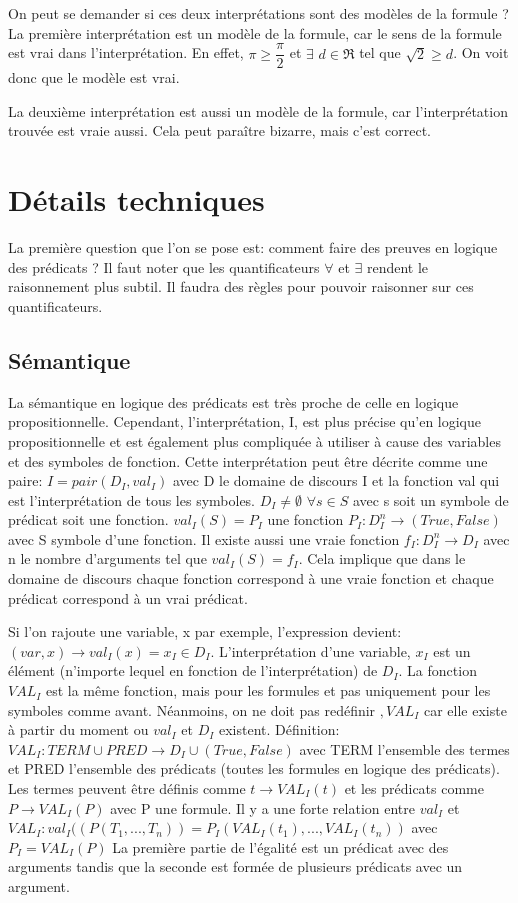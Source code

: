 On peut se demander si ces deux interprétations sont des modèles de la formule ? \\
La première interprétation est un modèle de la formule, car le sens de la formule est vrai dans l'interprétation. En effet, $\pi \geq \dfrac{\pi}{2}$ et $\exists$ $ d \in \Re$ tel que $\sqrt2 \geq d$. On voit donc que le modèle est vrai.

La deuxième interprétation est aussi un modèle de la formule, car l'interprétation trouvée est vraie aussi. Cela peut paraître bizarre, mais c'est correct. 
\section{Détails techniques}
La première question que l'on se pose est: comment faire des preuves en logique des prédicats ? Il faut noter que les quantificateurs $\forall$ et $\exists$ rendent le raisonnement plus subtil. Il faudra des règles pour pouvoir raisonner sur ces quantificateurs.
\subsection{Sémantique}
La sémantique en logique des prédicats est très proche de celle en logique propositionnelle. Cependant, l'interprétation, I, est plus précise qu'en logique propositionnelle et est également plus compliquée à utiliser à cause des variables et des symboles de fonction. Cette interprétation peut être décrite comme une paire: $I = pair(D_{I}, val_{I}) $ avec D le domaine de discours I et la fonction val qui est l'interprétation de tous les symboles. $D_{I} \ne \emptyset $ $ \forall s \in S$ avec s soit un symbole de prédicat soit une fonction. $val_{I}(S) = P_{I}$ une fonction $P_{I}:D_{I}^{n} \rightarrow (True,False)$ avec S symbole d'une fonction. Il existe aussi une vraie fonction $f_{I}:D_{I}^{n} \rightarrow D_{I}$ avec n le nombre d'arguments tel que $val_{I}(S) = f_{I} $. Cela implique que dans le domaine de discours chaque fonction correspond à une vraie fonction et chaque prédicat correspond à un vrai prédicat. 


Si l'on rajoute une variable, x par exemple, l'expression devient: $ (var, x) \rightarrow val_{I}(x) = x_{I} \in D_{I}$. L'interprétation d'une variable, $x_{I}$ est un élément (n'importe lequel en fonction de l'interprétation) de $D_{I}$. La fonction $VAL_{I}$ est la même fonction, mais pour les formules et pas uniquement pour les symboles comme avant. Néanmoins, on ne doit pas redéfinir $,VAL_{I}$ car elle existe à partir du moment ou $val_{I}$ et $D_{I}$ existent. Définition: $VAL_{I}: TERM \cup  PRED \rightarrow D_{I} \cup (True, False) $ avec TERM l'ensemble des termes et PRED l'ensemble des
prédicats (toutes les formules en logique des prédicats). Les termes peuvent être définis comme $ t \rightarrow VAL_{I}(t)$ et les prédicats comme $ P \rightarrow VAL_{I}(P)$ avec P une formule. Il y a une forte relation entre $val_{I} $ et $VAL_{I}: val_{I}((P(T_{1},...,T_{n})) = P_{I}(VAL_{I}(t_{1}),...,VAL_{I}(t_{n}))$ avec $ P_{I} = VAL_{I}(P)$ 
La première partie de l'égalité est un prédicat avec des arguments tandis que la seconde est formée de plusieurs prédicats avec un argument. 


